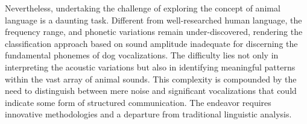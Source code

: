 
Nevertheless, undertaking the challenge of exploring the concept of animal language is a daunting task. Different from well-researched human language, the frequency range, and phonetic variations remain under-discovered, rendering the classification approach based on sound amplitude inadequate for discerning the fundamental phonemes of dog vocalizations. The difficulty lies not only in interpreting the acoustic variations but also in identifying meaningful patterns within the vast array of animal sounds. This complexity is compounded by the need to distinguish between mere noise and significant vocalizations that could indicate some form of structured communication. The endeavor requires innovative methodologies and a departure from traditional linguistic analysis. 



